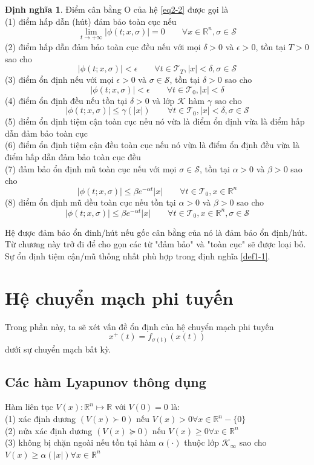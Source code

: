 \documentclass[14pt,a4paper,oneside]{report}		%
\theoremstyle{definition}
\newtheorem{define}[theorem]{Định nghĩa}
\begin{document}
\begin{define} \label{def2-1}
Điểm cân bằng O của hệ \ref{eq2-2} được gọi là\\
(1) điểm hấp dẫn (hút) đảm bảo toàn cục nếu
$$\lim_{t\rightarrow +\infty}|\phi (t;x,\sigma)|=0\qquad\forall x\in\mathbb{R}^n, \sigma\in\mathcal{S}$$
(2) điểm hấp dẫn đảm bảo toàn cục đều nếu với mọi $\delta >0$ và $\epsilon >0$, tồn tại $T>0$ sao cho
$$|\phi (t;x,\sigma)|<\epsilon\qquad\forall t\in\mathcal{T}_T, |x|<\delta,\sigma\in\mathcal{S}$$
(3) điểm ổn định nếu với mọi $\epsilon > 0$ và $\sigma\in\mathcal{S}$, tồn tại $\delta >0$ sao cho
$$|\phi (t;x,\sigma)|<\epsilon\qquad\forall t\in\mathcal{T}_0, |x|<\delta$$
(4) điểm ổn định đều nếu tồn tại $\delta > 0$ và lớp $\mathcal{K}$ hàm $\gamma$ sao cho
$$|\phi (t;x,\sigma)|\leq \gamma(|x|)\qquad\forall t\in\mathcal{T}_0, |x|<\delta,\sigma\in\mathcal{S}$$
(5) điểm ổn định tiệm cận toàn cục nếu nó vừa là điểm ổn định vừa là điểm hấp dẫn đảm bảo toàn cục\\
(6) điểm ổn định tiệm cận đều toàn cục nếu nó vừa là điểm ổn định đều vừa là điểm hấp dẫn đảm bảo toàn cục đều\\
(7) đảm bảo ổn định mũ toàn cục nếu với mọi $\sigma\in\mathcal{S}$, tồn tại $\alpha>0$ và $\beta >0$ sao cho
$$|\phi (t;x,\sigma)|\leq \beta e^{-\alpha t}|x|\qquad\forall t\in\mathcal{T}_0, x\in\mathbb{R}^n$$
(8) điểm ổn định mũ đều toàn cục nếu tồn tại $\alpha>0$ và $\beta >0$ sao cho
$$|\phi (t;x,\sigma)|\leq \beta e^{-\alpha t}|x|\qquad\forall t\in\mathcal{T}_0, x\in\mathbb{R}^n, \sigma\in\mathcal{S}$$
\end{define}

Hệ được đảm bảo ổn đinh/hút nếu gốc cân bằng của nó là đảm bảo ổn định/hút. Từ chương này trở đi để cho gọn các từ "đảm bảo" và "toàn cục" sẽ được loại bỏ. Sự ổn định tiệm cận/mũ thống nhất phù hợp trong định nghĩa \ref{def1-1}.

\section{Hệ chuyển mạch phi tuyến}
Trong phần này, ta sẽ xét vấn đề ổn định của hệ chuyển mạch phi tuyến
\begin{equation} \label{eq2-6}
x^+(t)=f_{\sigma (t)}(x(t))
\end{equation}
dưới sự chuyển mạch bất kỳ.
\subsection{Các hàm Lyapunov thông dụng}
Hàm liên tục $V(x): \mathbb{R}^n\mapsto \mathbb{R}$ với $V(0)=0$ là:\\
(1) xác định dương $(V(x)\succ 0)$ nếu $V(x)>0\forall x\in\mathbb{R}^n-\{0\}$ \\
(2) nửa xác định dương $(V(x)\succeq 0)$ nếu $V(x)\geq 0\forall x\in\mathbb{R}^n$ \\
(3) không bị chặn ngoài nếu tồn tại hàm $\alpha (\cdot)$ thuộc lớp $\mathcal{K}_\infty$ sao cho $V(x)\geq \alpha(|x|)\forall x\in\mathbb{R}^n$ \\
\end{document}

